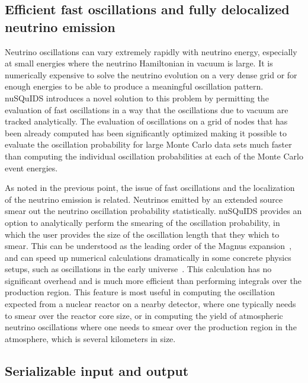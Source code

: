 \documentclass[3p,12pt]{elsarticle}
\newcommand{\ttf}{\ttfamily}
\begin{document}
\subsection{Efficient fast oscillations and fully delocalized neutrino emission}

Neutrino oscillations can vary extremely rapidly with neutrino energy, especially at small energies where the neutrino Hamiltonian in vacuum is large. 
It is numerically expensive to solve the neutrino evolution on a very dense grid or for enough energies to be able to produce a meaningful oscillation pattern.
{\ttf nuSQuIDS} introduces a novel solution to this problem by permitting the evaluation of fast oscillations in a way that the oscillations due to vacuum are tracked analytically.
The evaluation of oscillations on a grid of nodes that has been already computed has been significantly optimized making it possible to evaluate the oscillation probability for large Monte Carlo data sets much faster than computing the individual oscillation probabilities at each of the Monte Carlo event energies.

As noted in the previous point, the issue of fast oscillations and the localization of the neutrino emission is related. 
Neutrinos emitted by an extended source smear out the neutrino oscillation probability statistically.
{\ttf nuSQuIDS} provides an option to analytically perform the smearing of the oscillation probability, in which the user provides the size of the oscillation length that they which to smear.
This can be
understood as the leading order of the Magnus expansion~\cite{Magnus:1954zz}, and can
speed up numerical calculations dramatically in some concrete physics setups,
such as oscillations in the early universe~\cite{Hernandez:2016kel}. 
This calculation has no significant overhead and is much more efficient than performing integrals over the production region.
This feature is most useful in computing the oscillation expected from a nuclear reactor on a nearby detector, where one typically needs to smear over the reactor core size, or in computing the yield of atmospheric neutrino oscillations where one needs to smear over the production region in the atmosphere, which is several kilometers in size.

\subsection{Serializable input and output}
\end{document}

